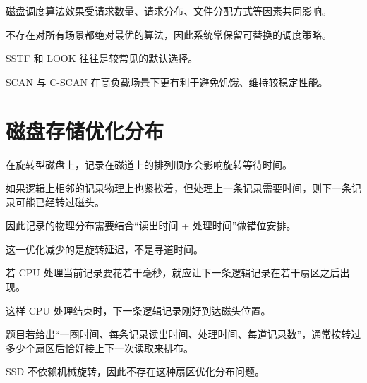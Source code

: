 \begin{points}
  \item 磁盘调度算法效果受请求数量、请求分布、文件分配方式等因素共同影响。
  \item 不存在对所有场景都绝对最优的算法，因此系统常保留可替换的调度策略。
  \item SSTF 和 LOOK 往往是较常见的默认选择。
  \item SCAN 与 C-SCAN 在高负载场景下更有利于避免饥饿、维持较稳定性能。
\end{points}


\section{磁盘存储优化分布}
\begin{points}
  \item 在旋转型磁盘上，记录在磁道上的排列顺序会影响旋转等待时间。
  \item 如果逻辑上相邻的记录物理上也紧挨着，但处理上一条记录需要时间，则下一条记录可能已经转过磁头。
  \item 因此记录的物理分布需要结合“读出时间 + 处理时间”做错位安排。
  \item 这一优化减少的是旋转延迟，不是寻道时间。
\end{points}


\begin{points}
  \item 若 CPU 处理当前记录要花若干毫秒，就应让下一条逻辑记录在若干扇区之后出现。
  \item 这样 CPU 处理结束时，下一条逻辑记录刚好到达磁头位置。
  \item 题目若给出“一圈时间、每条记录读出时间、处理时间、每道记录数”，通常按转过多少个扇区后恰好接上下一次读取来排布。
  \item SSD 不依赖机械旋转，因此不存在这种扇区优化分布问题。
\end{points}


